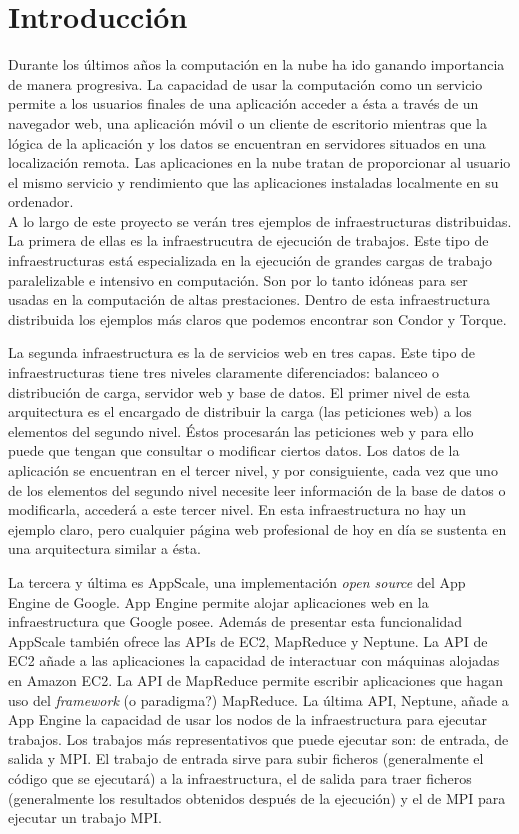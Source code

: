 \chapter{Introducción}
\label{cap:introduccion}


Durante los últimos años la computación en la nube ha ido ganando importancia de manera progresiva. La capacidad de usar la computación como un servicio permite a los usuarios finales de una aplicación acceder a ésta a través de un navegador web, una aplicación móvil o un cliente de escritorio mientras que la lógica de la aplicación y los datos se encuentran en servidores situados en una localización remota. Las aplicaciones en la nube tratan de proporcionar al usuario el mismo servicio y rendimiento que las aplicaciones instaladas localmente en su ordenador.\\

A lo largo de este proyecto se verán tres ejemplos de infraestructuras distribuidas. La primera de ellas es la infraestrucutra de ejecución de trabajos. Este tipo de infraestructuras está especializada en la ejecución de grandes cargas de trabajo paralelizable e intensivo en computación. Son por lo tanto idóneas para ser usadas en la computación de altas prestaciones. Dentro de esta infraestructura distribuida los ejemplos más claros que podemos encontrar son Condor y Torque.

La segunda infraestructura es la de servicios web en tres capas. Este tipo de infraestructuras tiene tres niveles claramente diferenciados: balanceo o distribución de carga, servidor web y base de datos. El primer nivel de esta arquitectura es el encargado de distribuir la carga (las peticiones web) a los elementos del segundo nivel. Éstos procesarán las peticiones web y para ello puede que tengan que consultar o modificar ciertos datos. Los datos de la aplicación se encuentran en el tercer nivel, y  por consiguiente, cada vez que uno de los elementos del segundo nivel necesite leer información de la base de datos o modificarla, accederá a este tercer nivel. En esta infraestructura no hay un ejemplo claro, pero cualquier página web profesional de hoy en día se sustenta en una arquitectura similar a ésta.

La tercera y última es AppScale, una implementación \emph{open source} del App Engine de Google. App Engine permite alojar aplicaciones web en la infraestructura que Google posee. Además de presentar esta funcionalidad AppScale también ofrece las APIs de EC2, MapReduce y Neptune. La API de EC2 añade a las aplicaciones la capacidad de interactuar con máquinas alojadas en Amazon EC2. La API de MapReduce permite escribir aplicaciones que hagan uso del \emph{framework} (o paradigma?) MapReduce. La última API, Neptune, añade a App Engine la capacidad de usar los nodos de la infraestructura para ejecutar trabajos. Los trabajos más representativos que puede ejecutar son: de entrada, de salida y MPI. El trabajo de entrada sirve para subir ficheros (generalmente el código que se ejecutará) a la infraestructura, el de salida para traer ficheros (generalmente los resultados obtenidos después de la ejecución) y el de MPI para ejecutar un trabajo MPI.

